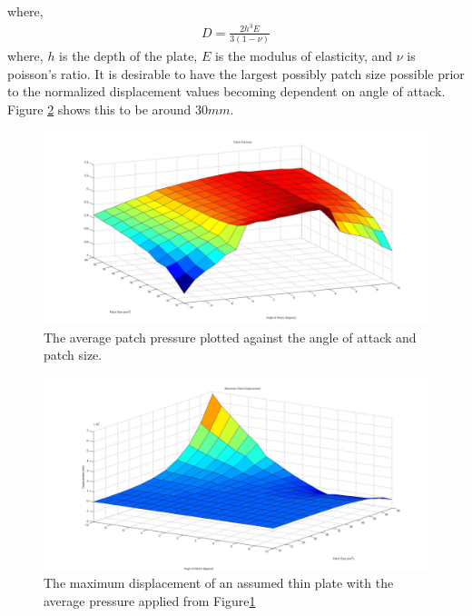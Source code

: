 \documentclass[11pt]{ucthesis}
\begin{document}
where,
\begin{eqnarray}
D = \frac{2h^3E}{3(1-\nu)}
\end{eqnarray}
where, $h$ is the depth of the plate, $E$ is the modulus of elasticity, and $\nu$ is poisson's ratio. It is desirable to have the largest possibly patch size possible prior to the normalized displacement values becoming dependent on angle of attack. Figure \ref{fig:PatchDisp} shows this to be around $30mm$. 
\begin{figure}[thpb]
\centering
\includegraphics[width=1\linewidth]{Figures/FreePatchPressure.jpg}
\caption{The average patch pressure plotted against the angle of attack and patch size.}
\label{fig:PProfile}
\end{figure}
\begin{figure}[thpb]
\centering
\includegraphics[width=1\linewidth]{Figures/MaximumPatchDisplacement.jpg}
\caption{The maximum displacement of an assumed thin plate with the average pressure applied from Figure\ref{fig:PProfile}}
\label{fig:PatchDisp}
\end{figure}
\end{document}
